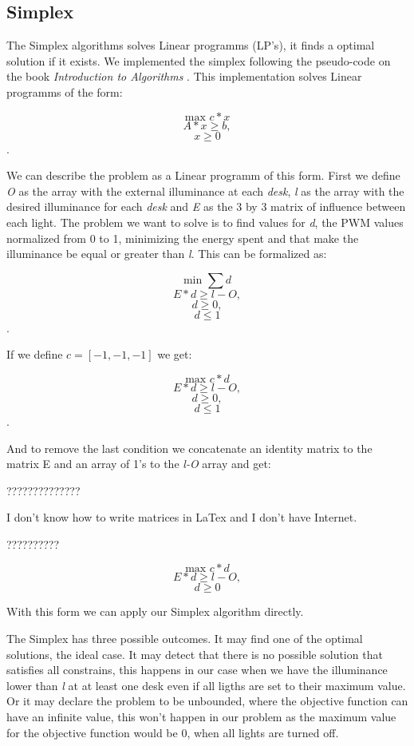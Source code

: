 \subsection{Simplex}
\label{sec:Simplex}

The Simplex algorithms solves Linear programms (LP's), it finds a optimal solution if it exists.
We implemented the simplex following the pseudo-code on the book \emph{Introduction to Algorithms} \cite{Cormen}.
This implementation solves Linear programms of the form:

$$ \text{max }c*x $$
$$    A*x \geq b, $$
$$    x \geq 0 $$.

We can describe the problem as a Linear programm of this form. First we define \emph{O} as the array with the external illuminance at each \emph{desk}, \emph{l} as the array with the desired illuminance for each \emph{desk} and \emph{E} as the  3 by 3 matrix of influence between each light.
The problem we want to solve is to find values for \emph{d}, the PWM values normalized from 0 to 1,  minimizing the energy spent and that make the illuminance be equal or greater than \emph{l}.
This can be formalized as:

$$ \text{min }\sum{d} $$
$$    E*d \geq l-O, $$
$$    d \geq 0, $$
$$    d \leq 1 $$.

If we define  $c = [-1, -1, -1]$ we get:

$$ \text{max }c*d $$
$$    E*d \geq l-O, $$
$$    d \geq 0, $$
$$    d \leq 1 $$.

And to remove the last condition we concatenate an identity matrix to the matrix E and an array of 1's to the \emph{l-O} array and get:

??????????????

I don't know how to write matrices in LaTex and I don't have Internet.

??????????

$$ \text{max }c*d $$
$$    E*d \geq l-O, $$
$$    d \geq 0 $$

With this form we can apply our Simplex algorithm directly.

The Simplex has three possible outcomes.
It may find one of the optimal solutions, the ideal case.
It may detect that there is no possible solution that satisfies all constrains, this happens in our case when we have the illuminance lower than \emph{l} at at least one desk even if all ligths are set to their maximum value.
Or it may declare the problem to be unbounded, where the objective function can have an infinite value, this won't happen in our problem as the maximum value for the objective function would be 0, when all lights are turned off.


